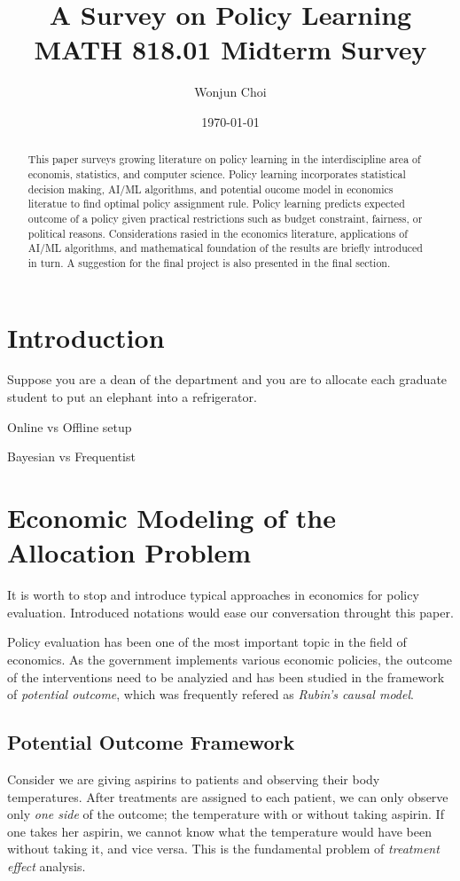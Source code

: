 \documentclass[11pt]{article}
\title{A Survey on Policy Learning\\
	\large MATH 818.01 Midterm Survey
}
\author{Wonjun Choi}
\date{\today}
\begin{document}
	
	\maketitle
	
	\begin{abstract}
This paper surveys growing literature on policy learning in the interdiscipline area of economis, statistics, and computer science. Policy learning incorporates statistical decision making, AI/ML algorithms, and potential oucome model in economics literatue to find optimal policy assignment rule. Policy learning predicts expected outcome of a policy given practical restrictions such as budget constraint, fairness, or political reasons. Considerations rasied in the economics literature, applications of AI/ML algorithms, and mathematical foundation of the results are briefly introduced in turn. A suggestion for the final project is also presented in the final section.
	\end{abstract}
	
	\section{Introduction}\label{section-introduction}
    Suppose you are a dean of the department and you are to allocate each graduate student to put an elephant into a refrigerator.

	Online vs Offline setup
	
	Bayesian vs Frequentist
	
	\section{Economic Modeling of the Allocation Problem}
	It is worth to stop and introduce typical approaches in economics for policy evaluation. Introduced notations would ease our conversation throught this paper.
	
	Policy evaluation has been one of the most important topic in the field of economics.  As the government implements various economic policies, the outcome of the interventions need to be analyzied and has been studied in the framework of \textit{potential outcome}, which was frequently refered as \textit{Rubin's causal model}.
	
	\subsection*{Potential Outcome Framework}
	Consider we are giving aspirins to patients and observing their body temperatures. After treatments are assigned to each patient, we can only observe only \textit{one side} of the outcome; the temperature with or without taking aspirin. If one takes her aspirin, we cannot know what the temperature would have been without taking it, and vice versa. This is the fundamental problem of \textit{treatment effect} analysis.
	
\end{document}
